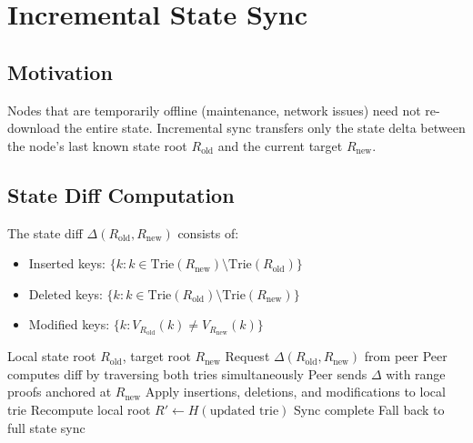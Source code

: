 \section{Incremental State Sync}
\label{sec:incremental}

\subsection{Motivation}

Nodes that are temporarily offline (maintenance, network issues) need not re-download the entire state. Incremental sync transfers only the state delta between the node's last known state root $R_{\text{old}}$ and the current target $R_{\text{new}}$.

\subsection{State Diff Computation}

\begin{definition}
The state diff $\Delta(R_{\text{old}}, R_{\text{new}})$ consists of:
\begin{itemize}
    \item Inserted keys: $\{k : k \in \text{Trie}(R_{\text{new}}) \setminus \text{Trie}(R_{\text{old}})\}$
    \item Deleted keys: $\{k : k \in \text{Trie}(R_{\text{old}}) \setminus \text{Trie}(R_{\text{new}})\}$
    \item Modified keys: $\{k : V_{R_{\text{old}}}(k) \neq V_{R_{\text{new}}}(k)\}$
\end{itemize}
\end{definition}

\begin{algorithm}[H]
\caption{Incremental Sync Protocol}
\label{alg:incremental}
\begin{algorithmic}[1]
\Require Local state root $R_{\text{old}}$, target root $R_{\text{new}}$
\State Request $\Delta(R_{\text{old}}, R_{\text{new}})$ from peer
\State Peer computes diff by traversing both tries simultaneously
\State Peer sends $\Delta$ with range proofs anchored at $R_{\text{new}}$
\State Apply insertions, deletions, and modifications to local trie
\State Recompute local root $R' \gets H(\text{updated trie})$
    \State Sync complete
\Else
    \State Fall back to full state sync
\EndIf
\end{algorithmic}
\end{algorithm}


